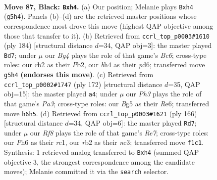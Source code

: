 \documentclass[11pt]{article}
\begin{document}
\clearpage

\begin{figure}[p]\centering
\begin{subfigure}{0.46\textwidth}\centering
\resizebox{\linewidth}{!}{%
\newchessgame
\chessboard[
  setfen={8/8/4k2p/3pp1b1/K3n2B/8/1R6/5r2 b - - 0 87},
  showmover=false,
  pgfstyle=straightmove, color=movearrow, markmove={g5-h4}
]}
\caption{}
\end{subfigure}\hfill
\begin{subfigure}{0.46\textwidth}\centering
\resizebox{\linewidth}{!}{%
\newchessgame
\chessboard[
  setfen={8/8/1kBp1b2/3P4/2K2p2/2P5/1P6/8 w - - 1 93},
  showmover=false,
  pgfstyle=straightmove, color=movearrow, markmove={c6-d7}
]}
\caption{}
\end{subfigure}
\\[4pt]
\begin{subfigure}{0.46\textwidth}\centering
\resizebox{\linewidth}{!}{%
\newchessgame
\chessboard[
  setfen={8/2k5/2b1R3/2N5/1PK5/P6r/8/8 w - - 39 87},
  showmover=false,
  pgfstyle=straightmove, color=movearrow, markmove={a3-a4}
]}
\caption{}
\end{subfigure}\hfill
\begin{subfigure}{0.46\textwidth}\centering
\resizebox{\linewidth}{!}{%
\newchessgame
\chessboard[
  setfen={3N3r/4R3/1KB3k1/PP6/8/2n5/8/2r5 w - - 9 84},
  showmover=false,
  pgfstyle=straightmove, color=movearrow, markmove={e7-d7}
]}
\caption{}
\end{subfigure}
\caption{\textbf{Move 87, Black: \texttt{Bxh4}.} (a) Our position; Melanie plays \texttt{Bxh4} (\texttt{g5h4}). Panels (b)--(d) are the retrieved master positions whose correspondence most drove this move (highest QAP objective among those that transfer to it). (b) Retrieved from \texttt{ccrl\_top\_p0003\#1610} (ply 184) [structural distance $d$=34, QAP obj=3]: the master played \texttt{Bd7}; under $\mu$ our \emph{Bg4} plays the role of that game's \emph{Bc6}; cross-type roles: our \emph{r}b2 as their \emph{P}b2, our \emph{b}h4 as their \emph{p}d6; transferred move \texttt{g5h4} \textbf{(endorses this move)}. (c) Retrieved from \texttt{ccrl\_top\_p0002\#1747} (ply 172) [structural distance $d$=35, QAP obj=15]: the master played \texttt{a4}; under $\mu$ our \emph{Ph3} plays the role of that game's \emph{Pa3}; cross-type roles: our \emph{B}g5 as their \emph{R}e6; transferred move \texttt{h6h5}. (d) Retrieved from \texttt{ccrl\_top\_p0003\#1621} (ply 166) [structural distance $d$=34, QAP obj=6]: the master played \texttt{Rd7}; under $\mu$ our \emph{Rf8} plays the role of that game's \emph{Re7}; cross-type roles: our \emph{P}h6 as their \emph{r}c1, our \emph{r}b2 as their \emph{n}c3; transferred move \texttt{f1c1}. Synthesis: 1 retrieved analog transferred to \texttt{Bxh4} (summed QAP objective 3, the strongest correspondence among the candidate moves); Melanie committed it via the \texttt{search} selector.}
\label{fig:thought-m173}
\end{figure}
\end{document}
